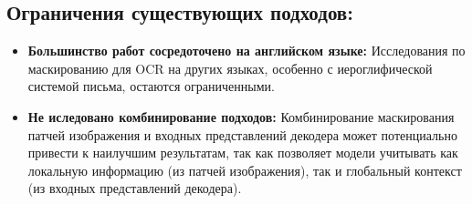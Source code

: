 \subsection{Ограничения  существующих  подходов:}

\begin{itemize}
    \item \textbf{Большинство  работ  сосредоточено  на  английском  языке:}  Исследования  по  маскированию  для  OCR  на  других  языках,  особенно  с  иероглифической  системой  письма,  остаются  ограниченными.
    \item \textbf{Не иследовано комбинирование подходов:}  Комбинирование  маскирования  патчей  изображения  и  входных  представлений  декодера может потенциально  привести  к  наилучшим  результатам,  так  как  позволяет  модели  учитывать  как  локальную  информацию  (из  патчей  изображения),  так  и  глобальный  контекст  (из  входных  представлений  декодера).
\end{itemize}

\newpage
